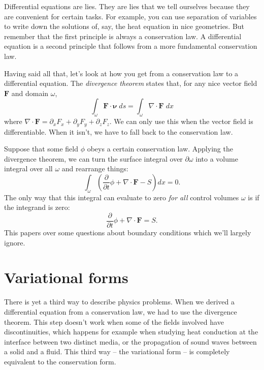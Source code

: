 \documentclass{article}
\theoremstyle{definition}
\theoremstyle{plain}
\newcommand{\bs}{\boldsymbol}
\begin{document}
Differential equations are lies.
They are lies that we tell ourselves because they are convenient for certain tasks.
For example, you can use separation of variables to write down the solutions of, say, the heat equation in nice geometries.
But remember that the first principle is always a conservation law.
A differential equation is a second principle that follows from a more fundamental conservation law.

Having said all that, let's look at how you get from a conservation law to a differential equation.
The \emph{divergence theorem} states that, for any nice vector field $\bs F$ and domain $\omega$,
\begin{equation}
    \int_\omega\bs F\cdot\bs \nu\; ds = \int_\omega\nabla\cdot\bs F\;dx
\end{equation}
where $\nabla\cdot\bs F = \partial_xF_x + \partial_yF_y + \partial_zF_z$.
We can only use this when the vector field is differentiable.
When it isn't, we have to fall back to the conservation law.

Suppose that some field $\phi$ obeys a certain conservation law.
Applying the divergence theorem, we can turn the surface integral over $\partial\omega$ into a volume integral over all $\omega$ and rearrange things:
\begin{equation}
    \int_\omega\left(\frac{\partial}{\partial t}\phi + \nabla\cdot\bs F - S\right)dx = 0.
\end{equation}
The only way that this integral can evaluate to zero \emph{for all} control volumes $\omega$ is if the integrand is zero:
\begin{equation}
    \frac{\partial}{\partial t}\phi + \nabla\cdot\bs F = S.
\end{equation}
This papers over some questions about boundary conditions which we'll largely ignore.


\section{Variational forms}

There is yet a third way to describe physics problems.
When we derived a differential equation from a conservation law, we had to use the divergence theorem.
This step doesn't work when some of the fields involved have discontinuities, which happens for example when studying heat conduction at the interface between two distinct media, or the propagation of sound waves between a solid and a fluid.
This third way -- the variational form -- is completely equivalent to the conservation form.
\end{document}
